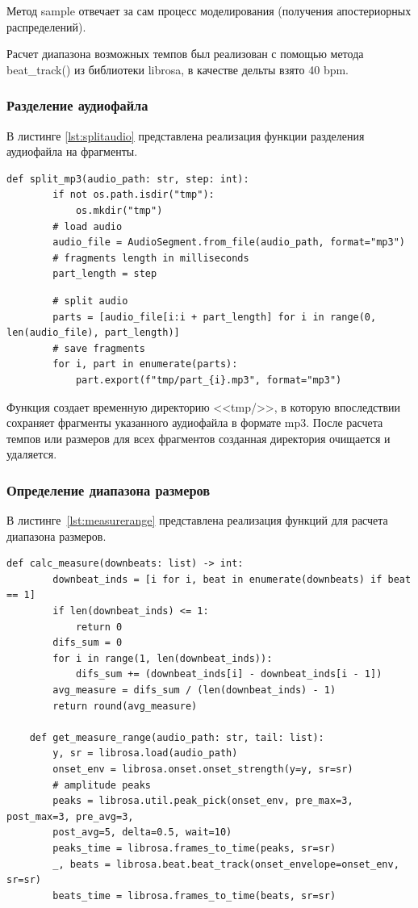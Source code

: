 Метод sample отвечает за сам процесс моделирования (получения апостериорных распределений).

Расчет диапазона возможных темпов был реализован с помощью метода beat\_track() из библиотеки librosa, в качестве дельты взято 40 bpm.

\subsubsection{Разделение аудиофайла}

В листинге \ref{lst:splitaudio} представлена реализация функции разделения аудиофайла на фрагменты.

\begin{lstlisting}[label={lst:splitaudio}, caption={разделение аудиофайла на фрагменты}]
	def split_mp3(audio_path: str, step: int):
		if not os.path.isdir("tmp"):
			os.mkdir("tmp")
		# load audio
		audio_file = AudioSegment.from_file(audio_path, format="mp3")
		# fragments length in milliseconds
		part_length = step
\end{lstlisting}

\begin{lstlisting}
		# split audio
		parts = [audio_file[i:i + part_length] for i in range(0, len(audio_file), part_length)]
		# save fragments
		for i, part in enumerate(parts):
			part.export(f"tmp/part_{i}.mp3", format="mp3")
\end{lstlisting}

Функция создает временную директорию <<tmp/>>, в которую впоследствии сохраняет фрагменты указанного аудиофайла в формате mp3. После расчета темпов или размеров для всех фрагментов созданная директория очищается и удаляется.

\subsubsection{Определение диапазона размеров}

В листинге~\ref{lst:measurerange} представлена реализация функций для расчета диапазона размеров.

\begin{lstlisting}[label={lst:measurerange}, caption={определение диапазона размеров}]
	def calc_measure(downbeats: list) -> int:
		downbeat_inds = [i for i, beat in enumerate(downbeats) if beat == 1]
		if len(downbeat_inds) <= 1:
			return 0
		difs_sum = 0
		for i in range(1, len(downbeat_inds)):
			difs_sum += (downbeat_inds[i] - downbeat_inds[i - 1])
		avg_measure = difs_sum / (len(downbeat_inds) - 1)
		return round(avg_measure)
	
	def get_measure_range(audio_path: str, tail: list):
		y, sr = librosa.load(audio_path)
		onset_env = librosa.onset.onset_strength(y=y, sr=sr)
		# amplitude peaks
		peaks = librosa.util.peak_pick(onset_env, pre_max=3, post_max=3, pre_avg=3,
		post_avg=5, delta=0.5, wait=10)
		peaks_time = librosa.frames_to_time(peaks, sr=sr)
		_, beats = librosa.beat.beat_track(onset_envelope=onset_env, sr=sr)
		beats_time = librosa.frames_to_time(beats, sr=sr)
\end{lstlisting}

